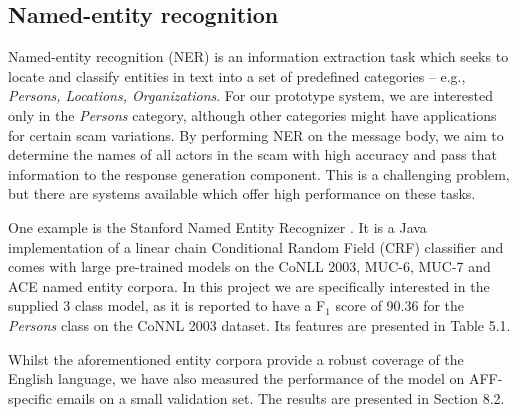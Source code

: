 \subsection{Named-entity recognition}
Named-entity recognition (NER) is an information extraction task which seeks to locate and classify entities in text into a set of predefined categories -- e.g., \textit{Persons, Locations, Organizations}. For our prototype system, we are interested only in the \emph{Persons} category, although other categories might have applications for certain scam variations. By performing NER on the message body, we aim to determine the names of all actors in the scam with high accuracy and pass that information to the response generation component. This is a challenging problem, but there are systems available which offer high performance on these tasks.

One example is the Stanford Named Entity Recognizer \cite{P15}. It is a Java implementation of a linear chain Conditional Random Field (CRF) classifier \cite{P16, P17} and comes with large pre-trained models on the CoNLL 2003, MUC-6, MUC-7 and ACE named entity corpora. In this project we are specifically interested in the supplied 3 class model, as it is reported to have a F$_{1}$ score of 90.36 for the \emph{Persons} class on the CoNNL 2003 dataset. Its features are presented in Table 5.1.

\begin{table}[h]
  \centering
   \caption{Features of Stanford NER 3 class model.}
\end{table}

Whilst the aforementioned entity corpora provide a robust coverage of the English language, we have also measured the performance of the model on AFF-specific emails on a small validation set. The results are presented in Section 8.2. 

